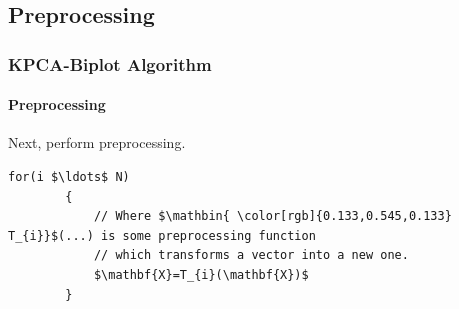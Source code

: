 \documentclass[serif]{beamer}
\begin{document}
	\subsection{Preprocessing}
	
	\begin{frame}[fragile,t]
		\frametitle{KPCA-Biplot Algorithm}
		\framesubtitle{Preprocessing}
		Next, perform preprocessing. \newline

		\begin{lstlisting}[mathescape]
		for(i $\ldots$ N)
		{
		    // Where $\mathbin{ \color[rgb]{0.133,0.545,0.133} T_{i}}$(...) is some preprocessing function
		    // which transforms a vector into a new one.	
		    $\mathbf{X}=T_{i}(\mathbf{X})$
		}
		\end{lstlisting}	
		
		\note
		{

		}
	\end{frame}
\end{document}
